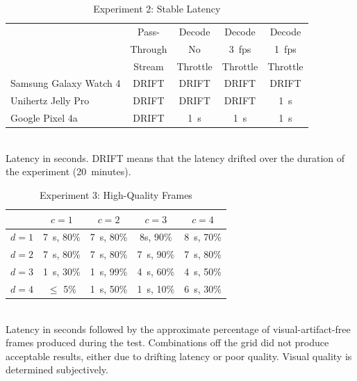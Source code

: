 \begin{table}
\centering
\begin{tabular}{|l|c|c|c|c|}
\hline
    & Pass- & Decode & Decode & Decode \\
    & Through & No & 3~fps & 1~fps \\
    & Stream & Throttle & Throttle & Throttle \\
\hline
Samsung Galaxy Watch 4 & \cellcolor{red!20}DRIFT & \cellcolor{red!20}DRIFT & \cellcolor{red!20}DRIFT & \cellcolor{red!20}DRIFT \\[0.1cm]
\hline
Unihertz Jelly Pro & \cellcolor{red!20}DRIFT & \cellcolor{red!20}DRIFT & \cellcolor{red!20}DRIFT & \cellcolor{green!20}1~s  \\[0.1cm]
\hline
Google Pixel 4a & \cellcolor{red!20}DRIFT & \cellcolor{green!20}1~s & \cellcolor{green!20}1~s & \cellcolor{green!20}1~s \\[0.1cm]
\hline
\end{tabular}
    \begin{captext}
    \\[0.1cm] \small Latency in seconds. DRIFT means that the latency drifted over the duration of the experiment (20~minutes).
    \end{captext}
\caption{Experiment 2: Stable Latency}
\label{tab:stable-latency}
\end{table}

\begin{table}
\centering
\begin{tabular}{|l|c|c|c|c|}
        \hline
        & $c = 1$ & $c = 2$ & $c = 3$ & $c = 4$ \\[0.1cm]
        \hline
$d = 1$ & 7~s, 80\% & 7~s, 80\%	& 8s, 90\%	& 8~s, 70\% \\[0.1cm]
\hline
$d = 2$ & 7~s, 80\% & 7~s, 80\% & 7~s, 90\%	& 7~s, 80\% \\[0.1cm]
\hline
$d = 3$ & 1~s, 30\% & \cellcolor{green!20}1~s, 99\%	& 4~s, 60\% & 4~s, 50\% \\[0.1cm]
\hline
$d = 4$ & $\leq$ 5\% & 1~s, 50\% &	1~s, 10\% & 6~s, 30\% \\[0.1cm]
\hline
\end{tabular}
    \begin{captext}
    \\[0.1cm] \small Latency in seconds followed by the approximate percentage of visual-artifact-free frames produced during the test. Combinations off the grid did not produce acceptable results, either due to drifting latency or poor quality. Visual quality is determined subjectively.
    \end{captext}
\caption{Experiment 3: High-Quality Frames}
\label{tab:hq-frames}
\end{table}


